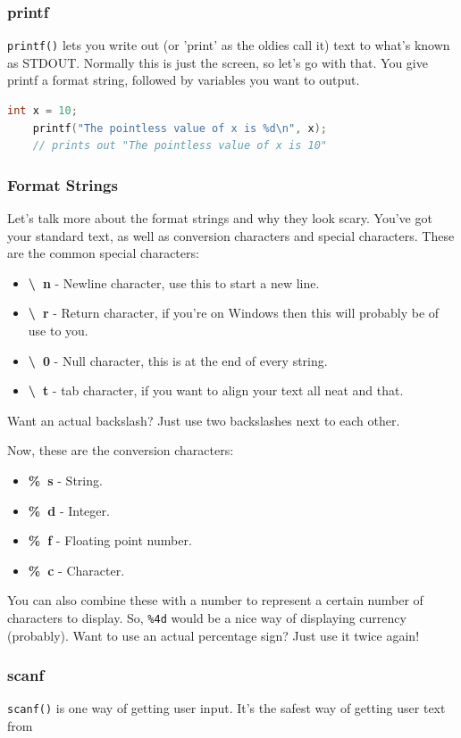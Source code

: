 \subsubsection{printf}
\texttt{printf()} lets you write out (or 'print' as the oldies call it) text to what's known as STDOUT. Normally this is just the screen, so let's go with that. You give printf a format string, followed by variables you want to output.
\begin{lstlisting}[language=C]
    int x = 10;
    printf("The pointless value of x is %d\n", x);
    // prints out "The pointless value of x is 10"
\end{lstlisting}

\subsubsection{Format Strings}
Let's talk more about the format strings and why they look scary. You've got your standard text, as well as conversion characters and special characters. These are the common special characters:
\begin{itemize}
    \item \textbf{\textbackslash~n} - Newline character, use this to start a new line.
    \item \textbf{\textbackslash~r} - Return character, if you're on Windows then this will probably be of use to you.
    \item \textbf{\textbackslash~0} - Null character, this is at the end of every string.
    \item \textbf{\textbackslash~t} - tab character, if you want to align your text all neat and that.
\end{itemize}

Want an actual backslash? Just use two backslashes next to each other.

Now, these are the conversion characters:
\begin{itemize}
    \item \textbf{\%~s} - String.
    \item \textbf{\%~d} - Integer.
    \item \textbf{\%~f} - Floating point number.
    \item \textbf{\%~c} - Character.
\end{itemize}
You can also combine these with a number to represent a certain number of characters to display. So, \texttt{\%4d} would be a nice way of displaying currency (probably). Want to use an actual percentage sign? Just use it twice again!

\subsubsection{scanf}
\texttt{scanf()} is one way of getting user input. It's the safest way of getting user text from

